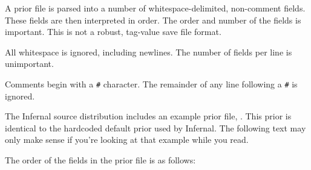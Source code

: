 %
%  

A prior file is parsed into a number of whitespace-delimited,
non-comment fields. These fields are then interpreted in order.  The
order and number of the fields is important. This is not a robust,
tag-value save file format.

All whitespace is ignored, including newlines. The number of fields
per line is unimportant.

Comments begin with a \verb+#+ character. The remainder of any line
following a \verb+#+ is ignored.

The Infernal source distribution includes an example prior file,
. This prior is identical to the hardcoded default
prior used by Infernal. The following text may only make sense if
you're looking at that example while you read.

The order of the fields in the prior file is as follows:

